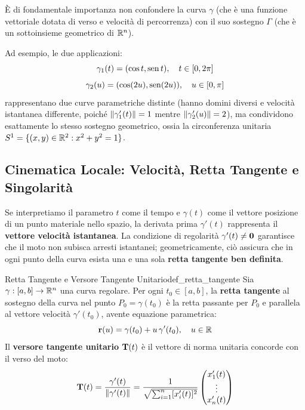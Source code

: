 \begin{osservazione}
È di fondamentale importanza non confondere la curva $\gamma$ (che è una funzione vettoriale dotata di verso e velocità di percorrenza) con il suo sostegno $\Gamma$ (che è un sottoinsieme geometrico di $\mathbb{R}^n$). 

Ad esempio, le due applicazioni:
\[
\gamma_1(t) = (\cos t, \operatorname{sen} t), \quad t \in [0, 2\pi]
\]
\[
\gamma_2(u) = (\cos(2u), \operatorname{sen}(2u)), \quad u \in [0, \pi]
\]
rappresentano due curve parametriche distinte (hanno domini diversi e velocità istantanea differente, poiché $\lVert\gamma_1'(t)\rVert = 1$ mentre $\lVert\gamma_2'(u)\rVert = 2$), ma condividono esattamente lo stesso sostegno geometrico, ossia la circonferenza unitaria $S^1 = \{(x,y) \in \mathbb{R}^2 : x^2 + y^2 = 1\}$.
\end{osservazione}

\subsection{Cinematica Locale: Velocità, Retta Tangente e Singolarità}

Se interpretiamo il parametro $t$ come il tempo e $\gamma(t)$ come il vettore posizione di un punto materiale nello spazio, la derivata prima $\gamma'(t)$ rappresenta il \textbf{vettore velocità istantanea}. La condizione di regolarità $\gamma'(t) \neq \mathbf{0}$ garantisce che il moto non subisca arresti istantanei; geometricamente, ciò assicura che in ogni punto della curva esista una e una sola \textbf{retta tangente ben definita}.

\begin{definizione}{Retta Tangente e Versore Tangente Unitario}{def_retta_tangente}
Sia $\gamma: [a,b] \to \mathbb{R}^n$ una curva regolare. Per ogni $t_0 \in [a,b]$, la \textbf{retta tangente} al sostegno della curva nel punto $P_0 = \gamma(t_0)$ è la retta passante per $P_0$ e parallela al vettore velocità $\gamma'(t_0)$, avente equazione parametrica:
\[
\mathbf{r}(u) = \gamma(t_0) + u \, \gamma'(t_0), \quad u \in \mathbb{R}
\]
Il \textbf{versore tangente unitario} $\mathbf{T}(t)$ è il vettore di norma unitaria concorde con il verso del moto:
\[
\mathbf{T}(t) = \frac{\gamma'(t)}{\lVert\gamma'(t)\rVert} = \frac{1}{\sqrt{\sum_{i=1}^n [x_i'(t)]^2}} \begin{pmatrix} x_1'(t) \\ \vdots \\ x_n'(t) \end{pmatrix}
\]
\end{definizione}

